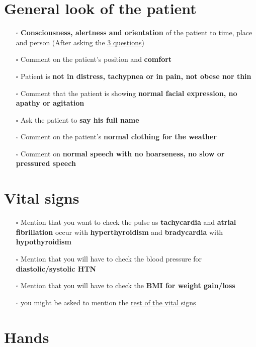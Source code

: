 \documentclass[
  13.5pt,
  a4paper,
  DIV=11,
  numbers=noendperiod]{scrreprt}
\providecommand{\tightlist}{%
  \setlength{\itemsep}{0pt}\setlength{\parskip}{0pt}}
\begin{document}
\section{General look of the
patient}\label{general-look-of-the-patient-4}

\begin{itemize}
\tightlist
\item[$\square$]
  \textbf{Consciousness, alertness and orientation} of the patient to
  time, place and person (After asking the \href{miscellaneous.qmd}{3
  questions})
\item[$\square$]
  Comment on the patient's position and \textbf{comfort}
\item[$\square$]
  Patient is \textbf{not in distress, tachypnea or in pain, not obese
  nor thin}
\item[$\square$]
  Comment that the patient is showing \textbf{normal facial expression,
  no apathy or agitation}
\item[$\square$]
  Ask the patient to \textbf{say his full name}
\item[$\square$]
  Comment on the patient's \textbf{normal clothing for the weather}
\item[$\square$]
  Comment on \textbf{normal speech with no hoarseness, no slow or
  pressured speech}
\end{itemize}

\section{Vital signs}\label{vital-signs-4}

\begin{itemize}
\tightlist
\item[$\square$]
  Mention that you want to check the pulse as \textbf{tachycardia} and
  \textbf{atrial fibrillation} occur with \textbf{hyperthyroidism} and
  \textbf{bradycardia} with \textbf{hypothyroidism}
\item[$\square$]
  Mention that you will have to check the blood pressure for
  \textbf{diastolic/systolic HTN}
\item[$\square$]
  Mention that you will have to check the \textbf{BMI for weight
  gain/loss}
\item[$\square$]
  you might be asked to mention the \href{miscellaneous.qmd}{rest of the
  vital signs}
\end{itemize}

\section{Hands}\label{hands-2}
\end{document}
